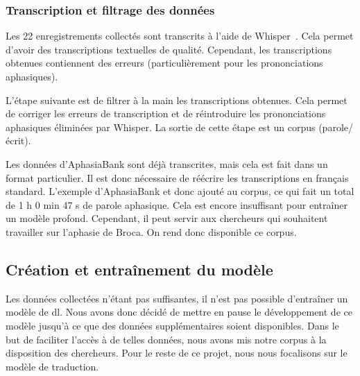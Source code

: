\subsubsection{Transcription et filtrage des données}

Les 22 enregistrements collectés sont transcrits à l'aide de 
Whisper~\cite{Radford_Kim_Xu_Brockman_McLeavey_Sutskever_2022}.
Cela permet d'avoir des transcriptions textuelles de qualité.
Cependant, les transcriptions obtenues contiennent des erreurs 
(particulièrement pour les prononciations aphasiques).

L'étape suivante est de filtrer à la main les transcriptions obtenues.
Cela permet de corriger les erreurs de transcription 
et de réintroduire les prononciations aphasiques éliminées par Whisper.
La sortie de cette étape est un corpus (parole/écrit).

Les données d'AphasiaBank sont déjà transcrites, mais cela est fait dans un format particulier.
Il est donc nécessaire de réécrire les transcriptions en français standard.
L'exemple d'AphasiaBank et donc ajouté au corpus, ce qui fait un total de 1 h 0 min 47 s de parole aphasique.
Cela est encore insuffisant pour entraîner un modèle profond.
Cependant, il peut servir aux chercheurs qui souhaitent travailler sur l'aphasie de Broca.
On rend donc disponible ce corpus.

\subsection{Création et entraînement du modèle}

Les données collectées n'étant pas suffisantes,
il n'est pas possible d'entraîner un modèle de \gls{dl}.
Nous avons donc décidé de mettre en pause le développement de ce modèle 
jusqu'à ce que des données supplémentaires soient disponibles.
Dans le but de faciliter l'accès à de telles données,
nous avons mis notre corpus à la disposition des chercheurs.
Pour le reste de ce projet,
nous nous focalisons sur le modèle de traduction.